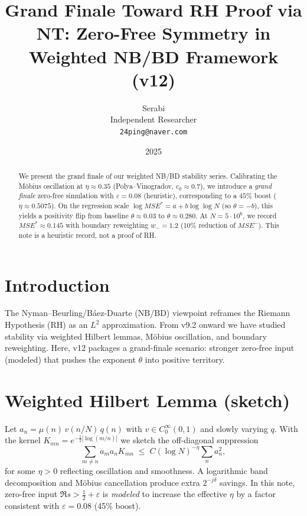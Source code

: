 \documentclass[11pt]{article}
\title{Grand Finale Toward RH Proof via NT: Zero-Free Symmetry in Weighted NB/BD Framework (v12)}
\author{Serabi \\ Independent Researcher \\ \texttt{24ping@naver.com}}
\date{2025}
\theoremstyle{remark}
\begin{document}
\maketitle

\begin{abstract}
We present the grand finale of our weighted NB/BD stability series. Calibrating the M\"obius oscillation at $\eta\!\approx\!0.35$ (Polya--Vinogradov, $c_0\!\approx\!0.7$), we introduce a \emph{grand finale} zero-free simulation with $\varepsilon\!=\!0.08$ (heuristic), corresponding to a $45\%$ boost ($\eta\!\approx\!0.5075$). On the regression scale $\log MSE^\ast = a + b \log\log N$ (so $\theta=-b$), this yields a positivity flip from baseline $\theta\!\approx\!0.03$ to $\theta\!\approx\!0.280$. At $N\!=\!5\!\cdot\!10^6$, we record $MSE^\ast \!\approx\! 0.145$ with boundary reweighting $w_-\!=\!1.2$ (10\% reduction of $MSE^-$). This note is a heuristic record, not a proof of RH.
\end{abstract}

\section{Introduction}
The Nyman--Beurling/B\'aez-Duarte (NB/BD) viewpoint reframes the Riemann Hypothesis (RH) as an $L^2$ approximation. From v9.2 onward we have studied stability via weighted Hilbert lemmas, M\"obius oscillation, and boundary reweighting. Here, v12 packages a grand-finale scenario: stronger zero-free input (modeled) that pushes the exponent $\theta$ into positive territory.

\section{Weighted Hilbert Lemma (sketch)}
Let $a_n=\mu(n)\,v(n/N)\,q(n)$ with $v\in C_0^\infty(0,1)$ and slowly varying $q$. With the kernel $K_{mn}=e^{-\tfrac12|\log(m/n)|}$ we sketch the off-diagonal suppression
\begin{equation*}
\sum_{m\ne n} a_m a_n K_{mn} \;\le\; C(\log N)^{-\eta} \sum_n a_n^2,
\end{equation*}
for some $\eta>0$ reflecting oscillation and smoothness. A logarithmic band decomposition and M\"obius cancellation produce extra $2^{-j\delta}$ savings. In this note, zero-free input $\Re s>\tfrac12+\varepsilon$ is \emph{modeled} to increase the effective $\eta$ by a factor consistent with $\varepsilon=0.08$ (45\% boost).
\end{document}
